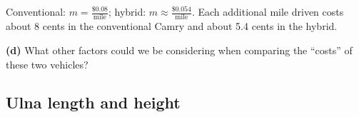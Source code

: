 \documentclass[12pt]{ximera}
\begin{document}
\begin{problem}
\begin{prompt}
\begin{solution}
Conventional: $m = \frac{\$0.08}{\text{mile}}$; hybrid:
$m \approx \frac{\$0.054}{\text{mile}}$. Each additional mile driven costs about
8 cents in the conventional Camry and about 5.4 cents in the hybrid.
\end{solution}
\end{prompt}

\begin{prompt}
\textbf{(d)} What other factors could we be considering when comparing the ``costs''
of these two vehicles?
\begin{freeResponse}
\end{freeResponse}
\end{prompt}
\end{problem}

\subsection*{Ulna length and height}
\end{document}
